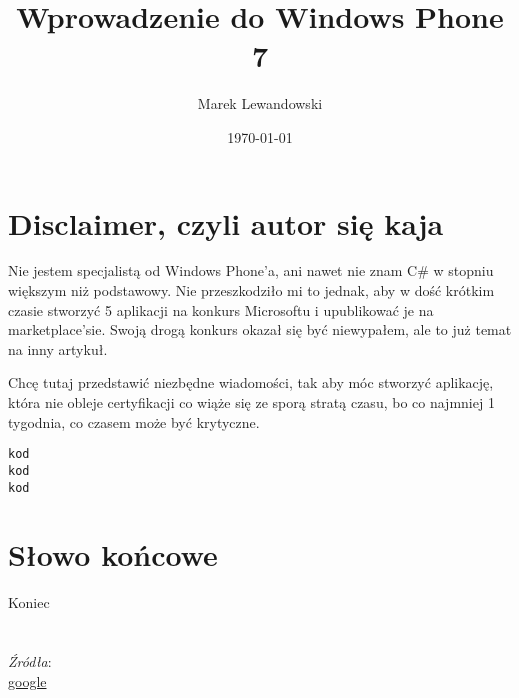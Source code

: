 \documentclass[12pt, a4paper]{article}
\begin{document}
\title{Wprowadzenie do Windows Phone 7}
\author{Marek Lewandowski}
\date{\today}



\maketitle


\section{Disclaimer, czyli autor się kaja}
 Nie jestem specjalistą od Windows Phone'a, ani nawet nie znam C\# w stopniu
 większym niż podstawowy. Nie przeszkodziło mi to jednak, aby w dość krótkim czasie stworzyć 5 aplikacji na
konkurs Microsoftu i upublikować je na marketplace'sie. Swoją drogą konkurs
okazał się być niewypałem, ale to już temat na inny artykuł.

Chcę tutaj przedstawić niezbędne wiadomości, tak aby móc stworzyć aplikację,
która nie obleje certyfikacji co wiąże się ze sporą
stratą czasu, bo co najmniej 1 tygodnia, co czasem może być krytyczne.


\begin{lstlisting}
kod
kod
kod
\end{lstlisting} 

\section{Słowo końcowe}
Koniec
\\\\\\
\emph{Źródła}:\\
\href{http://www.google.pl}{google}\\
\end{document}
